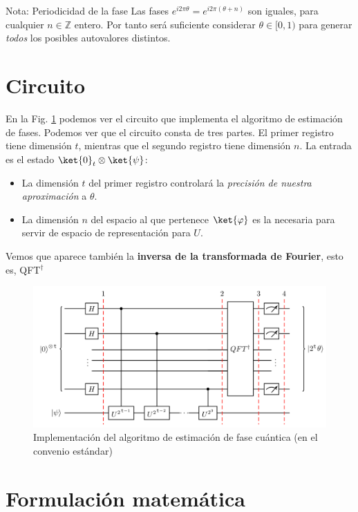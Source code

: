 \documentclass[a4paper,11pt]{book} %
\numberwithin{equation}{chapter}
\begin{document}
	\begin{mybox_blue}{Nota: Periodicidad de la fase}
	Las fases  $e^{i2\pi \theta}=e^{i2\pi (\theta+n)}$  son iguales, para cualquier $n\in {\mathbb Z}$ entero. Por tanto será suficiente considerar  $\theta \in [0,1)$ para generar \textit{todos} los  posibles autovalores distintos.
	\end{mybox_blue}

\section{Circuito}

En la Fig. \ref{Fig-QPE} podemos ver el circuito que implementa el algoritmo de estimación de fases. Podemos ver que el circuito consta de tres partes. El primer registro tiene dimensión $t$, mientras que el segundo registro tiene dimensión $n$. La entrada es el estado $\ket{0}_t \otimes \ket{\psi}$:
\begin{itemize}
	\item La dimensión $t$ del primer registro controlará la \textit{precisión de nuestra aproximación} a $\theta$. 
	\item La dimensión $n$ del espacio al que pertenece $\ket{\varphi}$  es la necesaria para servir de espacio de representación para $U$.
\end{itemize}
Vemos que aparece también la \textbf{inversa de la transformada de Fourier}, esto es, QFT$^\dagger$

\begin{figure}[t]
\centering 
\includegraphics[width=0.8\linewidth]{Figuras/Fig-QPE-Circuito.png}
\caption{Implementación del algoritmo de estimación de fase cuántica (en el convenio estándar)}
\label{Fig-QPE}
\end{figure}



\section{Formulación matemática}
\end{document}
